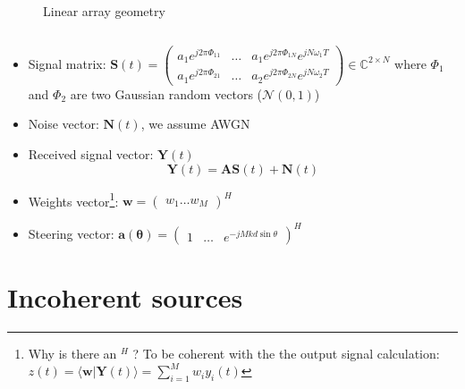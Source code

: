 \documentclass[UKenglish,8pt,aspectratio=1610]{beamer}
\begin{document}
\begin{frame}
\begin{columns}
\begin{column}{0.4\textwidth}
\begin{figure}[h!]
				\centering
				\caption{Linear array geometry}
			\end{figure}
			\end{column}
		\end{columns} 
\begin{itemize}
	\item  Signal matrix: $\mathbf{S}(t)=\begin{pmatrix}
		a_1e^{j2\pi\Phi_{11}}&\dots&a_1e^{j2\pi\Phi_{1N}}e^{jN\omega_1T}\\
			a_1e^{j2\pi\Phi_{21}}&\dots&a_2e^{j2\pi\Phi_{2N}}e^{jN\omega_2T}
	\end{pmatrix}\in\mathbb{C}^{2\times N}$  where $\Phi_1$ and $\Phi_2$ are two Gaussian random vectors ($\mathcal{N}(0,1)$)
\item Noise vector: $\mathbf{N}(t)$, we assume AWGN
\item Received signal vector: $\mathbf{Y}(t)$
		\begin{equation}
			\mathbf{Y}(t)=\mathbf{A}\mathbf{S}(t) + \mathbf{N}(t)
		\end{equation}
\item Weights vector\footnote{Why is there an $^H$ ? To be coherent with the the output signal calculation: $z(t) =\langle\mathbf{w}\rvert \mathbf{Y}(t)\rangle=\sum_{i=1}^{M}w_iy_i(t)$}: $\mathbf{w}=\begin{pmatrix}
w_1\dots w_M
\end{pmatrix}^H$
\item Steering vector: $\mathbf{a(\theta)}=\begin{pmatrix}
	1&\dots&e^{-jMkd\sin\theta}
\end{pmatrix}^H$
	\end{itemize}
	\end{frame}
	\section{Incoherent sources}
\end{document}
